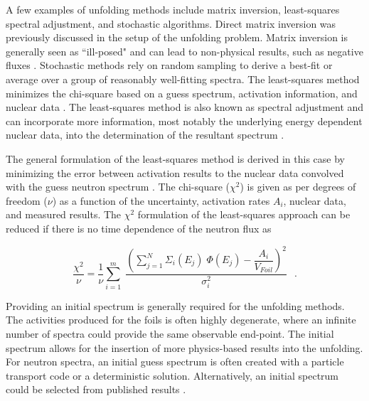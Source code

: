 A few examples of unfolding methods include  matrix inversion, least-squares spectral adjustment, and stochastic algorithms\cite{Reginatto2010}. 
Direct matrix inversion was previously discussed in the setup of the unfolding problem. 
Matrix inversion is generally seen as ``ill-posed" and can lead to non-physical results, such as negative fluxes \cite{Reginatto2010, Vagena2018b}. 
Stochastic methods rely on random sampling to derive a best-fit or average over a group of reasonably well-fitting spectra\cite{Reginatto2010}. 
The least-squares method minimizes the chi-square based on a guess spectrum, activation information, and nuclear data \cite{Perey1977}.
The least-squares method is also known as spectral adjustment and can incorporate more information, most notably the underlying energy dependent nuclear data, into the determination of the resultant spectrum \cite{Perey1977}.  

The general formulation of the least-squares method is derived in this case by minimizing the error between activation results to the nuclear data convolved with the guess neutron spectrum \cite{Perey1977}. 
The chi-square ($\chi^{2}$) is given as per degrees of freedom ($\nu$) as a function of the uncertainty, activation rates $A_{i}$, nuclear data, and measured results. 
The $\chi^{2}$ formulation of the least-squares approach can be reduced if there is no time dependence of the neutron flux as

\begin{equation} \label{eq:LeastSq2}
\dfrac{\chi^2}{\nu}= \dfrac{1}{\nu}\sum_{i=1}^{m} \; \dfrac{(\sum_{j=1}^{N} \Sigma_{i}(E_{j}) \;\Phi(E_{j})-\dfrac{A_{i}}{V_{Foil}})^{2}}{\sigma_{i}^{2}} \,\;\;.
\end{equation}

Providing an initial spectrum is generally required for the unfolding methods. 
The activities produced for the foils is often highly degenerate, where an infinite number of spectra could provide the same observable end-point. 
The initial spectrum allows for the insertion of more physics-based results into the unfolding. 
For neutron spectra, an initial guess spectrum is often created with a particle transport code or a deterministic solution. 
Alternatively, an initial spectrum could be selected from published results \cite{VegaCarrillo2002}. 